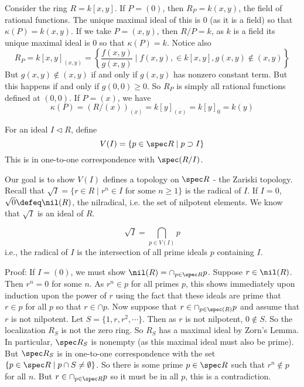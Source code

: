\begin{ex}
Consider the ring $R=k[x,y]$. If $P=(0)$, then $R_P=k(x,y)$, the field of rational functions. The unique maximal ideal of this is 0 (as it is a field) so that $\kappa(P)=k(x,y)$. If we take $P=(x,y)$, then $R/P=k$, as $k$ is a field its unique maximal ideal is 0 so that $\kappa(P)=k$. Notice also
\[
R_P=k[x,y]_{(x,y)}=\left\{\frac{f(x,y)}{g(x,y)} \;|\; f(x,y), \in k[x,y], g(x,y) \notin (x,y) \right\}
\]
But $g(x,y) \notin (x,y)$ if and only if $g(x,y)$ has nonzero constant term. But this happens if and only if $g(0,0) \geq 0$. So $R_P$ is simply all rational functions defined at $(0,0)$. If $P=(x)$, we have 
\[
\kappa(P)=(R/(x))_{(\overline{x})}=k[y]_{\overline{(x)}}=k[y]_0=k(y)
\]
\end{ex}

\begin{dfn}
For an ideal $I \lhd R$, define
\[
V(I)=\{p \in \spec R \;|\; p \supset I\}
\]
This is in one-to-one correspondence with $\spec(R/I)$.
\end{dfn}

Our goal is to show $V(I)$ defines a topology on $\spec R$ - the Zariski topology. Recall that $\sqrt{I}=\{ r \in R \;|\; r^n \in I \text{ for some }n \geq 1\}$ is the radical of $I$. If $I=0$, $\sqrt{0} \defeq \nil(R)$, the nilradical, i.e. the set of nilpotent elements. We know that $\sqrt{I}$ is an ideal of $R$. 

\begin{thmm}
\[
\sqrt{I}= \bigcap_{p \in V(I)} p
\]
i.e., the radical of $I$ is the intersection of all prime ideals $p$ containing $I$.
\end{thmm}

\noindent Proof: If $I=(0)$, we must show $\nil(R)=\cap_{p \in \spec R} p$. Suppose $r \in \nil(R)$. Then $r^n=0$ for some $n$. As $r^n \in p$ for all primes $p$, this shows immediately upon induction upon the power of $r$ using the fact that these ideals are prime that $r \in p$ for all $p$ so that $r \in \cap p$. Now suppose that $r \in \cap_{p \in \spec(R)} p$ and assume that $r$ is not nilpotent. Let $S=\{1,r,r^2,\cdots\}$. Then as $r$ is not nilpotent, $0 \notin S$. So the localization $R_S$ is not the zero ring. So $R_S$ has a maximal ideal by Zorn's Lemma. In particular, $\spec R_S$ is nonempty (as this maximal ideal must also be prime). But $\spec R_S$ is in one-to-one correspondence with the set $\{p \in \spec R\;|\; p \cap S \neq \emptyset\}$. So there is some prime $p \in \spec R$ such that $r^n \notin p$ for all $n$. But $r \in \cap_{p \in \spec R} p$ so it must be in all $p$, this is a contradiction. 

